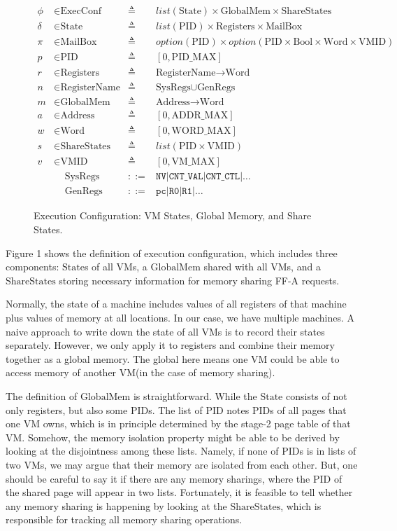 \documentclass[a4paper]{article}
\newcommand*{\defined}{\triangleq}
\newcommand*{\maps}{\rightarrow}
\newcommand*{\derived}{::=}
\newcommand*{\CONF}{\text{ExecConf}}
\newcommand*{\STATE}{\text{State}}
\newcommand*{\MEM}{\text{GlobalMem}}
\newcommand*{\SSS}{\text{ShareStates}}
\newcommand*{\PID}{\text{PID}}
\newcommand*{\REGS}{\text{Registers}}
\newcommand*{\ADDR}{\text{Address}}
\newcommand*{\WORD}{\text{Word}}
\newcommand*{\VMID}{\text{VMID}}
\newcommand*{\REGNAMES}{\text{RegisterName}}
\newcommand*{\MB}{\text{MailBox}}
\newcommand*{\PAMAX}{\text{ADDR\_MAX}}
\newcommand*{\PPIDMAX}{\text{PID\_MAX}}
\newcommand*{\PWMAX}{\text{WORD\_MAX}}
\newcommand*{\PVMMAX}{\text{VM\_MAX}}
\begin{document}
\begin{figure}
  \begin{align*}
    \phi &\in \CONF &\defined &list(\STATE) \times \MEM \times \SSS \\
    \delta &\in \STATE &\defined &list(\PID) \times \REGS \times \MB \\
    \pi & \in \MB &\defined &option(\PID) \times option(\PID \times \text{Bool} \times \WORD \times \VMID) \\
    p & \in \PID &\defined  &[ 0, \PPIDMAX ] \\
    r & \in \REGS &\defined  &\REGNAMES \maps \WORD \\
    n & \in \REGNAMES &\defined &\text{SysRegs} \cup \text{GenRegs} \\
    m & \in \MEM &\defined  &\ADDR \maps \WORD \\
    a & \in \ADDR &\defined  &[ 0, \PAMAX ] \\
    w & \in \WORD &\defined  &[ 0, \PWMAX ] \\
    s & \in \SSS &\defined  &list(\PID \times \VMID) \\
    v & \in \VMID &\defined  &[ 0, \PVMMAX ] \\
      & \;\;\;\; \text{SysRegs} &\derived & \mathtt{NV} | \mathtt{CNT\_VAL} | \mathtt{CNT\_CTL} | \dots \\
      & \;\;\;\; \text{GenRegs} &\derived & \mathtt{pc} | \mathtt {R0} | \mathtt{R1} | \dots
  \end{align*}
  \caption{Execution Configuration: VM States, Global Memory, and Share States.}
\end{figure}
Figure 1 shows the definition of execution configuration, which includes three
components: $\STATE$s of all VMs, a $\MEM$ shared with all VMs, and a $\SSS$
storing necessary information for memory sharing FF-A requests.

Normally, the state of a machine includes values of all
registers of that machine plus values of memory at all locations. In our case,
we have multiple machines. A naive approach to write down the state of all VMs
is to record their states separately. However, we only apply it to registers and
combine their memory together as a global memory. The global here means one VM
could be able to access memory of another VM(in the case of memory sharing).

The definition of $\MEM$ is straightforward. While the $\STATE$ consists of not
only registers, but also some $\PID$s.
The list of $\PID$ notes $\PID$s of all
pages that one VM owns, which is in principle determined by the stage-2 page
table of that VM.
Somehow, the memory isolation property might be able to be derived
by looking at the disjointness among these lists. Namely, if none of $\PID$s is in
lists of two VMs, we may argue that their memory are isolated from each other.
But, one should be careful to say it if there are any memory sharings, where the $\PID$
of the shared page will appear in two lists. Fortunately, it is feasible to tell
whether any memory sharing is happening by looking at the $\SSS$, which is responsible
for tracking all memory sharing operations.
\end{document}
